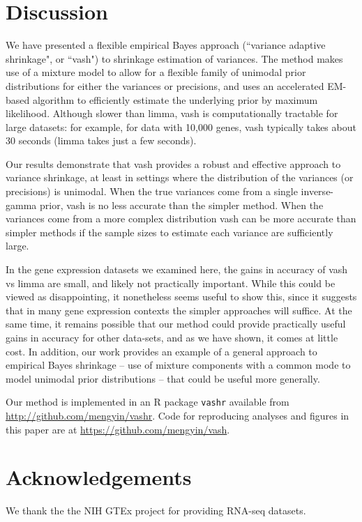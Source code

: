 \documentclass{bioinfo}
\begin{document}
\section{Discussion}

We have presented a flexible empirical Bayes approach (``variance adaptive shrinkage", or ``vash") 
to shrinkage estimation of variances. The method makes use of a mixture model to 
allow for a flexible family of unimodal prior distributions for either the variances or precisions, and uses an accelerated EM-based algorithm to efficiently 
estimate the underlying prior by maximum likelihood. Although slower than limma, vash is computationally tractable for large datasets: for example, for data with 10,000 genes, vash typically takes about 30 seconds (limma takes just a few seconds).

Our results demonstrate that vash provides a robust and effective approach to variance shrinkage, at least in settings where the distribution of the variances
(or precisions) is unimodal. When the true variances come from a single inverse-gamma prior, vash is no less accurate than the simpler method. When the 
variances come from a more complex distribution vash can be more accurate than simpler methods if the sample sizes to estimate each variance are sufficiently large.

In the gene expression datasets we examined here, the gains in accuracy of vash vs limma are small, and likely not practically important. While this could
be viewed as disappointing, it nonetheless seems useful to show this, since it suggests that in many gene expression contexts the simpler approaches will suffice.
At the same time, it remains possible that our method could provide practically useful gains in accuracy for other data-sets, and as we have shown, it comes at little cost.
In addition, our work provides an example of a general approach to empirical Bayes shrinkage -- use of mixture components with a common mode to model
unimodal prior distributions -- that could be useful more generally.

Our method is implemented in an R package \texttt{vashr} available from \href{http://github.com/mengyin/vashr}{http://github.com/mengyin/vashr}. Code for reproducing analyses and figures in this paper are at \href{https://github.com/mengyin/vash}{https://github.com/mengyin/vash}.

\section*{Acknowledgements}
We thank the the NIH GTEx project for providing RNA-seq datasets. 
\end{document}
